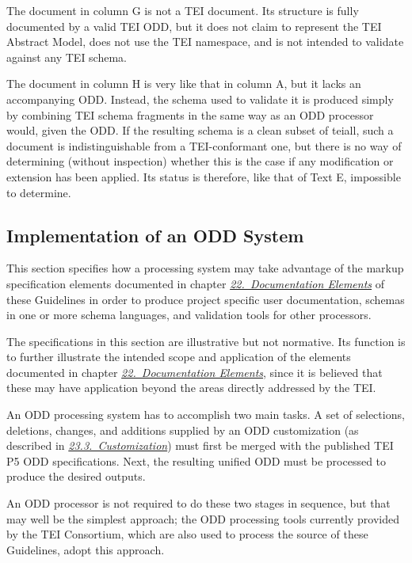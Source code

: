 The document in column G is not a TEI document. Its structure is fully documented by a valid TEI ODD, but it does not claim to represent the TEI Abstract Model, does not use the TEI namespace, and is not intended to validate against any TEI schema. \par
The document in column H is very like that in column A, but it lacks an accompanying ODD. Instead, the schema used to validate it is produced simply by combining TEI schema fragments in the same way as an ODD processor would, given the ODD. If the resulting schema is a clean subset of \textsf{tei\textunderscore all}, such a document is indistinguishable from a TEI-conformant one, but there is no way of determining (without inspection) whether this is the case if any modification or extension has been applied. Its status is therefore, like that of Text E, impossible to determine.
\subsection[{Implementation of an ODD System}]{Implementation of an ODD System}\label{IM}\par
This section specifies how a processing system may take advantage of the markup specification elements documented in chapter \textit{\hyperref[TD]{22.\ Documentation Elements}} of these Guidelines in order to produce project specific user documentation, schemas in one or more schema languages, and validation tools for other processors.\par
The specifications in this section are illustrative but not normative. Its function is to further illustrate the intended scope and application of the elements documented in chapter \textit{\hyperref[TD]{22.\ Documentation Elements}}, since it is believed that these may have application beyond the areas directly addressed by the TEI.\par
An ODD processing system has to accomplish two main tasks. A set of selections, deletions, changes, and additions supplied by an ODD customization (as described in \textit{\hyperref[MD]{23.3.\ Customization}}) must first be merged with the published TEI P5 ODD specifications. Next, the resulting unified ODD must be processed to produce the desired outputs.\par
An ODD processor is not required to do these two stages in sequence, but that may well be the simplest approach; the ODD processing tools currently provided by the TEI Consortium, which are also used to process the source of these Guidelines, adopt this approach.
